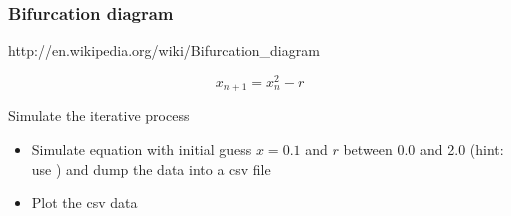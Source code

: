 \begin{frame}[fragile]

    \frametitle{Bifurcation diagram}

    http://en.wikipedia.org/wiki/Bifurcation\_diagram

    \bigskip

    \begin{equation*}
        x_{n+1} = x_n^2 - r
    \end{equation*}

    \bigskip

    Simulate the iterative process

    \begin{itemize}

        \item Simulate equation with initial guess $x=0.1$ and $r$ between 0.0 and 2.0 (hint: use ) and dump the data into a csv file
        \item Plot the csv data

    \end{itemize}

\end{frame}



